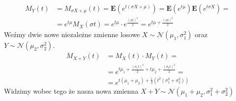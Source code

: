 \documentclass{article}
\numberwithin{equation}{subsection}
\begin{document}
\begin{align}
    M_Y(t) &= M_{\sigma X + \mu} (t) = \mathbf{E}(e^{t(\sigma X + \mu)}) = \mathbf{E}(e^{t\mu})\mathbf{E}(e^{t\sigma X}) =\\
    &= e^{t\mu} M_X(\sigma t) = e^{t\mu} \cdot e^{\frac{(\sigma t)^2}{2}} = e^{t\mu + \frac{(\sigma t)^2}{2}}
\end{align}
Weźmy dwie nowe niezależne zmienne losowe $X\sim\mathcal{N}(\mu_1, \sigma_1^2)$ oraz $Y\sim\mathcal{N}(\mu_2, \sigma_2^2)$.
\begin{align}
    M_{X+Y} (t) &= M_X(t)\cdot M_Y(t) =\\
    &= e^{t\mu_1 +\frac{(\sigma_1 t)^2}{2} + t\mu_2 +\frac{(\sigma_2 t)^2}{2}} =\\
    &= e^{t(\mu_1+\mu_2) + \frac{1}{2}(t^2(\sigma_1^2+\sigma_2^2))}
\end{align}
Widzimy wobec tego że nasza nowa zmienna $X+Y \sim \mathcal{N}(\mu_1 + \mu_2, \sigma_1^2 + \sigma_2^2)$
\end{document}
